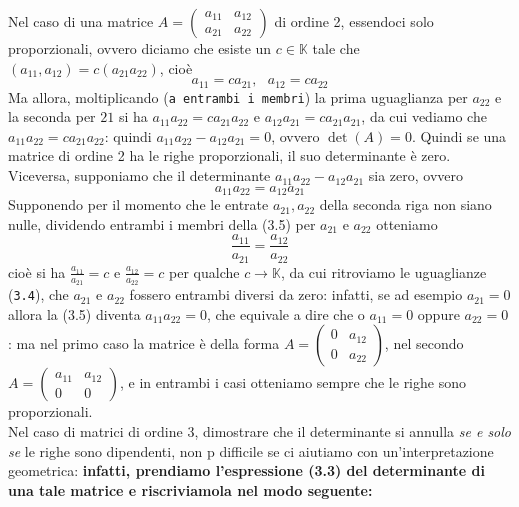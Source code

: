\documentclass{book}
\begin{document}
Nel caso di una matrice $A = \begin{pmatrix} a_{11} & a_{12} \\ a_{21} & a_{22} \end{pmatrix}$ di ordine 2, essendoci solo proporzionali, ovvero diciamo che esiste un $c \in \mathds{K}$ tale che $(a_{11},a_{12})=c(a_{21}a_{22})$, cioè
\begin{equation}
	a_{11}=ca_{21},\text{ }a_{12}=ca_{22}
\end{equation}
Ma allora, moltiplicando ({\tt a entrambi i membri}) la prima uguaglianza per $a_{22}$ e la seconda per $21$ si ha $a_{11}a_{22}=ca_{21}a_{22}$ e $a_{12}a_{21}=ca_{21}a_{21}$, da cui vediamo che $a_{11}a_{22}=ca_{21}a_{22}$: quindi $a_{11}a_{22}-a_{12}a_{21}=0$, ovvero $\det(A)=0$. Quindi se una matrice di ordine 2 ha le righe proporzionali, il suo determinante è zero.\\
Viceversa, supponiamo che il determinante $a_{11}a_{22}-a_{12}a_{21}$ sia zero, ovvero
\begin{equation}
	a_{11}a_{22}=a_{12}a_{21}
\end{equation}
Supponendo per il momento che le entrate $a_{21},a_{22}$ della seconda riga non siano nulle, dividendo entrambi i membri della (3.5) per $a_{21}$ e $a_{22}$  otteniamo
\begin{equation}
	\frac{a_{11}}{a_{21}}=\frac{a_{12}}{a_{22}}
\end{equation}
cioè si ha $\frac{a_{11}}{a_{21}}=c$ e $\frac{a_{12}}{a_{22}}=c$ per qualche $c\to \mathds{K}$, da cui ritroviamo le uguaglianze ({\tt 3.4}), che $a_{21}$ e $a_{22}$ fossero entrambi diversi da zero: infatti, se ad esempio $a_{21}=0$ allora la (3.5) diventa $a_{11}a_{22}=0$, che equivale a dire che o $a_{11}=0$ oppure $a_{22}=0$: ma nel primo caso la matrice è della forma $A=\begin{pmatrix} 0 & a_{12} \\ 0 & a_{22}\end{pmatrix}$, nel secondo $A=\begin{pmatrix} a_{11} & a_{12} \\ 0 & 0\end{pmatrix}$, e in entrambi i casi otteniamo sempre che le righe sono proporzionali.\\
Nel caso di matrici di ordine 3, dimostrare che il determinante si annulla {\em se e solo se} le righe sono dipendenti, non p difficile se ci aiutiamo con un'interpretazione geometrica: {\bf infatti, prendiamo l'espressione (3.3) del determinante di una tale matrice e riscriviamola nel modo seguente:}
\end{document}
